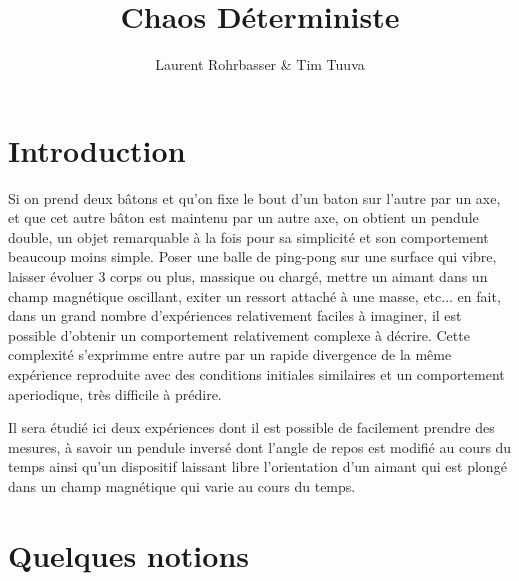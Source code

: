 \documentclass[a4paper,12pt,oneside]{article}
\begin{document}
\title{Chaos Déterministe}
\author{Laurent Rohrbasser \& Tim Tuuva}

\maketitle
\tableofcontents
\baselineskip=16pt
\parindent=15pt
\parskip=5pt


\newpage

\section{Introduction}
Si on prend deux bâtons et qu'on fixe le bout d'un baton sur l'autre par un axe, et que cet autre bâton est maintenu par un autre axe, on obtient un pendule double, un objet remarquable à la fois pour sa simplicité et son comportement beaucoup moins simple. Poser une balle de ping-pong sur une surface qui vibre, laisser évoluer 3 corps ou plus, massique ou chargé, mettre un aimant dans un champ magnétique oscillant, exiter un ressort attaché à une masse, etc... en fait, dans un grand nombre d'expériences relativement faciles à imaginer, il est possible d'obtenir un comportement relativement complexe à décrire. Cette complexité s'exprimme entre autre par un rapide divergence de la même expérience reproduite avec des conditions initiales similaires et un comportement aperiodique, très difficile à prédire.

Il sera étudié ici deux expériences dont il est possible de facilement prendre des mesures, à savoir un pendule inversé dont l'angle de repos est modifié au cours du temps ainsi qu'un dispositif laissant libre l'orientation d'un aimant qui est plongé dans un champ magnétique qui varie au cours du temps.


\section{Quelques notions}
\label{Quelques notions}
\end{document}
